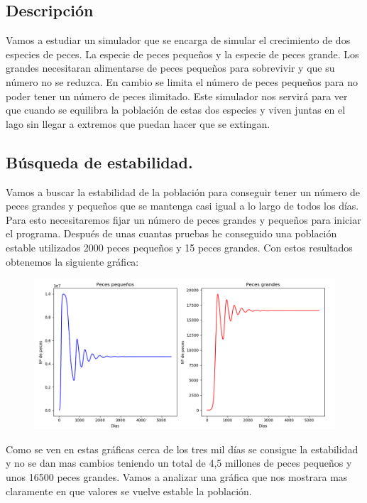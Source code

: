 \documentclass[]{article}
\begin{document}
\subsection{Descripción}
Vamos a estudiar un simulador que se encarga de simular el crecimiento de dos especies de peces. La especie de peces pequeños y la especie de peces grande. Los grandes necesitaran alimentarse de peces pequeños para sobrevivir y que su número no se reduzca. En cambio se limita el número de peces pequeños para no poder tener un número de peces ilimitado. Este simulador nos servirá para ver que cuando se equilibra la población de estas dos especies y viven juntas en el lago sin llegar a extremos que puedan hacer que se extingan.
\subsection{Búsqueda de estabilidad.}
Vamos a buscar la estabilidad de la población para conseguir tener un número de peces grandes y pequeños que se mantenga casi igual a lo largo de todos los días. Para esto necesitaremos fijar un número de peces grandes y pequeños para iniciar el programa. Después de unas cuantas pruebas he conseguido una población estable utilizados 2000 peces pequeños y 15 peces grandes. Con estos resultados obtenemos la siguiente gráfica:
\begin{figure}[H]
	\centering
	\includegraphics[width=1\linewidth]{img/screenshot0024}
	\caption{}
	\label{fig:screenshot0024}
\end{figure}
Como se ven en estas gráficas cerca de los tres mil días se consigue la estabilidad y no se dan mas cambios teniendo un total de 4,5 millones de peces pequeños y unos 16500 peces grandes. 
Vamos a analizar una gráfica que nos mostrara mas claramente en que valores se vuelve estable la población.
\end{document}
